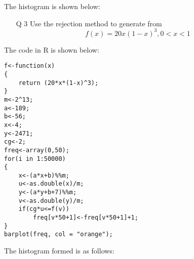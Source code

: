 \documentclass[12pt]{book}
\begin{document}
\newpage
The histogram is shown below:
\begin{figure}[H]
	\centering
\end{figure}
\newpage
\begin{enumerate}
\item[Q 3] Use the rejection method to generate from $$f(x)=20x(1-x)^3, 0<x<1$$
\end{enumerate}
The code in R is shown below:\\
\begin{lstlisting}
f<-function(x)
{
	return (20*x*(1-x)^3);
}
m<-2^13;
a<-189;
b<-56;
x<-4;
y<-2471;
cg<-2;
freq<-array(0,50);
for(i in 1:50000)
{
	x<-(a*x+b)%%m;
	u<-as.double(x)/m;
	y<-(a*y+b+7)%%m;
	v<-as.double(y)/m;
	if(cg*u<=f(v))
		freq[v*50+1]<-freq[v*50+1]+1;
}
barplot(freq, col = "orange");
\end{lstlisting}
\newpage
The histogram formed is as follows:
\begin{figure}[H]
	\centering
\end{figure}
\end{document}
